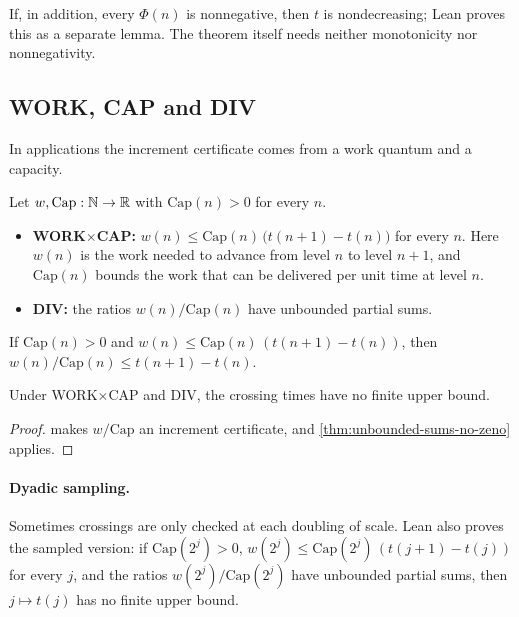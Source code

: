 If, in addition, every $\Phi(n)$ is nonnegative, then $t$ is nondecreasing; Lean proves this as a
separate lemma. The theorem itself needs neither monotonicity nor nonnegativity.

\subsection{WORK, CAP and DIV}

In applications the increment certificate comes from a work quantum and a capacity.

\begin{definition}\label{def:work-cap-div}
Let $w,\mathrm{Cap}:\mathbb{N}\to\mathbb{R}$ with $\mathrm{Cap}(n)>0$ for every $n$.
\begin{itemize}
\item \textbf{WORK$\times$CAP:} $w(n)\le \mathrm{Cap}(n)\,\bigl(t(n+1)-t(n)\bigr)$ for every $n$.
Here $w(n)$ is the work needed to advance from level $n$ to level $n+1$, and $\mathrm{Cap}(n)$
bounds the work that can be delivered per unit time at level $n$.
\item \textbf{DIV:} the ratios $w(n)/\mathrm{Cap}(n)$ have unbounded partial sums.
\end{itemize}
\end{definition}

\begin{theorem}\label{thm:workcap-increment}
If $\mathrm{Cap}(n)>0$ and $w(n)\le\mathrm{Cap}(n)\,(t(n+1)-t(n))$, then
$w(n)/\mathrm{Cap}(n)\le t(n+1)-t(n)$.
\end{theorem}

\begin{theorem}\label{thm:workcap-no-zeno}
Under WORK$\times$CAP and DIV, the crossing times have no finite upper bound.
\end{theorem}

\begin{proof}
 makes $w/\mathrm{Cap}$ an increment certificate, and
\cref{thm:unbounded-sums-no-zeno} applies.
\end{proof}

\paragraph{Dyadic sampling.}
Sometimes crossings are only checked at each doubling of scale. Lean also proves the sampled
version: if $\mathrm{Cap}(2^j)>0$, $w(2^j)\le\mathrm{Cap}(2^j)\,(t(j+1)-t(j))$ for every $j$, and the
ratios $w(2^j)/\mathrm{Cap}(2^j)$ have unbounded partial sums, then $j\mapsto t(j)$ has no finite
upper bound.

